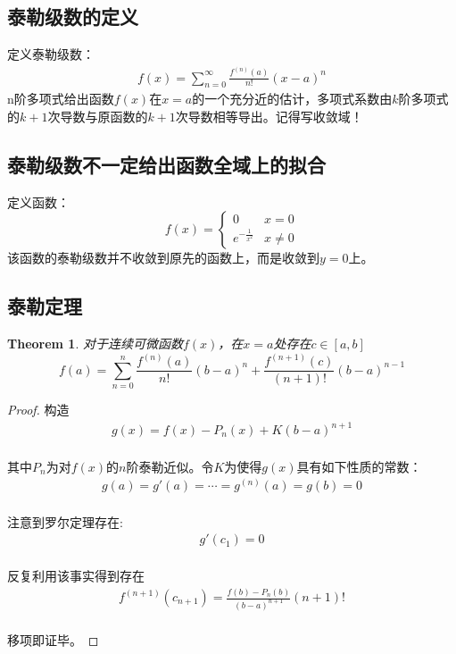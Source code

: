 \documentclass[12pt,a4paper,UTF8]{ctexbook}
\theoremstyle{plain}
\newtheorem{theorem}{\indent Theorem}[section]
\begin{document}
\subsection{泰勒级数的定义}
定义泰勒级数：
\begin{align}
    f(x)=\sum_{n=0}^\infty \frac{f^{(n)}(a)}{n!}(x-a)^n
\end{align}
n阶多项式给出函数$f(x)$在$x=a$的一个充分近的估计，多项式系数由$k$阶多项式的$k+1$次导数与原函数的$k+1$次导数相等导出。记得写收敛域！
\subsection{泰勒级数不一定给出函数全域上的拟合}
定义函数：
\begin{equation}
f(x)=\left\{\begin{array}{lc}0&x=0\\e^{-\frac{1}{x^2}}&x\ne 0\end{array}\right.
\end{equation}
该函数的泰勒级数并不收敛到原先的函数上，而是收敛到$y=0$上。
\subsection{泰勒定理}
\begin{theorem}
    对于连续可微函数$f(x)$，在$x=a$处存在$c\in [a,b]$
    \begin{equation}
        f(a)=\sum_{n=0}^n \frac{f^{(n)}(a)}{n!}(b-a)^n+\frac{f^{(n+1)}(c)}{(n+1)!}(b-a)^{n-1}
    \end{equation}
\end{theorem}
\begin{proof}
构造
\begin{align}
g(x)=f(x)-P_n(x)+K(b-a)^{n+1}
\end{align}
\paragraph{}
其中$P_{n}$为对$f(x)$的$n$阶泰勒近似。令$K$为使得$g(x)$具有如下性质的常数：
\begin{align}
g(a)=g'(a)=\cdots = g^{(n)}(a)=g(b)=0
\end{align}
\paragraph{}
注意到罗尔定理存在:
\begin{align}
g'(c_1)=0
\end{align}
\paragraph{}
反复利用该事实得到存在
\begin{align}
f^{(n+1)}(c_{n+1})=\frac{f(b)-P_n(b)}{(b-a)^{n+1}}(n+1)!
\end{align}
\paragraph{}
移项即证毕。\qedhere
\end{proof}
\end{document}
